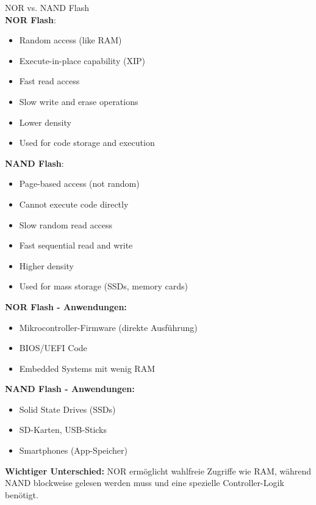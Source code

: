\begin{definition}{NOR vs. NAND Flash}\\
\textbf{NOR Flash}:
\begin{itemize}
    \item Random access (like RAM)
    \item Execute-in-place capability (XIP)
    \item Fast read access
    \item Slow write and erase operations
    \item Lower density
    \item Used for code storage and execution
\end{itemize}
\textbf{NAND Flash}:
\begin{itemize}
    \item Page-based access (not random)
    \item Cannot execute code directly
    \item Slow random read access
    \item Fast sequential read and write
    \item Higher density
    \item Used for mass storage (SSDs, memory cards)
\end{itemize}
\end{definition}

\begin{example}
    \textbf{NOR Flash - Anwendungen:}
    \begin{itemize}
        \item Mikrocontroller-Firmware (direkte Ausführung)
        \item BIOS/UEFI Code
        \item Embedded Systems mit wenig RAM
    \end{itemize}
    
    \textbf{NAND Flash - Anwendungen:}
    \begin{itemize}
        \item Solid State Drives (SSDs)
        \item SD-Karten, USB-Sticks
        \item Smartphones (App-Speicher)
    \end{itemize}
    
    \textbf{Wichtiger Unterschied:}
    NOR ermöglicht wahlfreie Zugriffe wie RAM, während NAND blockweise gelesen werden muss und eine spezielle Controller-Logik benötigt.
\end{example}

